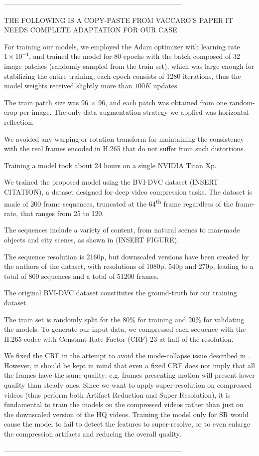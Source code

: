 -----------------------------------------------------------------------------

THE FOLLOWING IS A COPY-PASTE FROM VACCARO'S PAPER
IT NEEDS COMPLETE ADAPTATION FOR OUR CASE

For training our models, we employed the Adam optimizer with learning rate $1\times10^{-4}$, and trained the model for 80 epochs with the batch composed of 32 image patches (randomly sampled from the train set), which was large enough for stabilizing the entire training; each epoch consists of 1280 iterations, thus the model weights received slightly more than $100K$ updates.

The train patch size was 96 × 96, and each patch was obtained from one random-crop per image.
The only data-augmentation strategy we applied was horizontal reflection.

We avoided any warping or rotation transform for maintaining the consistency with the real frames encoded in H.265 that do not suffer from such distortions.

Training a model took about 24 hours on a single NVIDIA Titan Xp.

We trained the proposed model using the BVI-DVC dataset (INSERT CITATION), a dataset designed for deep video compression tasks. The dataset is made of 200 frame sequences, truncated at the 64\textsuperscript{th} frame regardless of the frame-rate, that ranges from 25 to 120.

The sequences include a variety of content, from natural scenes to man-made objects and
city scenes, as shown in (INSERT FIGURE).

The sequence resolution is 2160p, but downscaled versions have been created by the authors of the dataset, with resolutions of 1080p, 540p and 270p, leading to a total of 800 sequences and a total of 51200 frames.

The original BVI-DVC dataset constitutes the ground-truth for our training dataset.

The train set is randomly split for the 80\% for training and 20\% for validating the models.
To generate our input data, we compressed each sequence with the H.265 codec with Constant Rate Factor (CRF) 23 at half of the resolution.

We fixed the CRF in the attempt to avoid the mode-collapse issue described in \cite{galteri2019deep}. However, it should be kept in mind that even a fixed CRF does not imply that all the frames have the same quality: e.g. frames presenting motion will present lower quality than steady ones.
Since we want to apply super-resolution on compressed videos (thus perform both Artifact Reduction and Super Resolution), it is fundamental to train the models on the compressed videos rather than just on the downscaled version of the HQ videos. Training the model only for SR would cause the model to fail to detect the features to super-resolve, or to even enlarge the compression artifacts and reducing the overall quality.

-----------------------------------------------------------------------------


